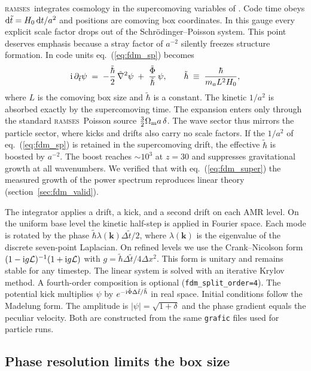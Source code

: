 \documentclass[11pt,a4paper]{article}
\newcommand{\ramses}{\textsc{ramses}}
\newcommand{\code}[1]{\texttt{#1}}
\begin{document}
\ramses\ integrates cosmology in the supercomoving variables of
\citet{MartelShapiro1998}. Code time obeys
${\rm d}\tilde t=H_0\,{\rm d}t/a^2$ and positions are comoving box
coordinates. In this gauge every explicit scale factor drops out
of the Schr\"odinger--Poisson system. This point deserves emphasis
because a stray factor of $a^{-2}$ silently freezes structure
formation. In code units eq.~(\ref{eq:fdm_sp}) becomes
\begin{equation}
{\rm i}\,\partial_{\tilde t}\psi
 \;=\; -\frac{\tilde\hbar}{2}\,\tilde\nabla^2\psi
 \;+\; \frac{\tilde\Phi}{\tilde\hbar}\,\psi,
\qquad
\tilde\hbar \;\equiv\; \frac{\hbar}{m_a L^2 H_0},
\label{eq:fdm_super}
\end{equation}
where $L$ is the comoving box size and $\tilde\hbar$ is a
constant. The kinetic $1/a^2$ is absorbed exactly by the
supercomoving time. The expansion enters only through the standard
\ramses\ Poisson source $\tfrac32\Omega_{\rm m}a\,\delta$. The
wave sector thus mirrors the particle sector, where kicks and
drifts also carry no scale factors. If the $1/a^2$ of
eq.~(\ref{eq:fdm_sp}) is retained in the supercomoving drift, the
effective $\tilde\hbar$ is boosted by $a^{-2}$. The boost reaches
$\sim\!10^3$ at $z=30$ and suppresses gravitational growth at all
wavenumbers. We verified that with eq.~(\ref{eq:fdm_super}) the
measured growth of the power spectrum reproduces linear theory
(section~\ref{sec:fdm_valid}).

The integrator applies a drift, a kick, and a second drift on each
AMR level. On the uniform base level the kinetic half-step is
applied in Fourier space. Each mode is rotated by the phase
$\tilde\hbar\lambda(\boldsymbol k)\Delta\tilde t/2$, where
$\lambda(\boldsymbol k)$ is the eigenvalue of the discrete
seven-point Laplacian. On refined levels we use the
Crank--Nicolson form
$(1-{\rm i}g\mathcal L)^{-1}(1+{\rm i}g\mathcal L)$ with
$g=\tilde\hbar\Delta\tilde t/4\Delta x^2$. This form is unitary
and remains stable for any timestep. The linear system is solved
with an iterative Krylov method. A fourth-order composition
\citep{Yoshida1990} is optional (\code{fdm\_split\_order=4}). The
potential kick multiplies $\psi$ by
$e^{-{\rm i}\tilde\Phi\Delta\tilde t/\tilde\hbar}$ in real space.
Initial conditions follow the Madelung form. The amplitude is
$|\psi|=\sqrt{1+\delta}$ and the phase gradient equals the
peculiar velocity. Both are constructed from the same
\code{grafic} files used for particle runs.

\subsection{Phase resolution limits the box size}
\label{sec:fdm_box}
\end{document}
